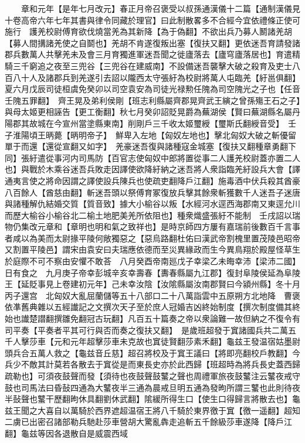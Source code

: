 　　章和元年【是年七月改元】春正月帝召褒受以叔孫通漢儀十二篇【通制漢儀見十卷高帝六年七年其書與律令同藏於理官】曰此制散畧多不合經今宜依禮條正使可施行　護羌校尉傅育欲伐燒當羌為其新降【為于偽翻】不欲出兵乃募人鬭諸羌胡【募人間搆諸羌使之自鬬也】羌胡不肯遂復叛出塞【復扶又翻】更依迷吾育請發諸郡兵數萬人共擊羌未及會三月育獨進軍迷吾聞之徙廬落去【廬穹廬落居也】育遣精騎三千窮追之夜至三兜谷【三兜谷在建威南】不設備迷吾襲擊大破之殺育及吏士八百八十人及諸郡兵到羌遂引去詔以隴西太守張紆為校尉將萬人屯臨羌【紆邕俱翻】　夏六月戊辰司徒桓虞免癸卯以司空袁安為司徒光禄勲任隗為司空隗光之子也【任音壬隗五罪翻】　齊王晃及弟利侯剛【班志利縣屬齊郡晃齊武王縯之曾孫殤王石之子】與母太姬更相誣告【更工衡翻】秋七月癸卯詔貶晃爵為蕪湖侯【賢曰蕪湖縣名屬丹陽郡其故城在今宣州當塗縣東南】削剛戶三千收太姬璽綬【璽斯氏翻綬音受】　壬子淮陽頃王昞薨【昞明帝子】　鮮卑入左地【匈奴左地也】擊北匈奴大破之斬優留單于而還【還從宣翻又如字】　羌豪迷吾復與諸種寇金城塞【復扶又翻種章勇翻下同】張紆遣從事河内司馬防【百官志使匈奴中郎將置從事二人護羌校尉蓋亦置二人也】與戰於木乘谷迷吾兵敗走因譯使欲降紆納之迷吾將人衆詣臨羌紆設兵大會【譯通夷言使之將命因謂之譯使設兵陳兵也使疏吏翻降戶江翻】施毒酒中伏兵殺其酋豪八百餘人【酋慈由翻】斬迷吾頭以祭傅育冢復放兵擊其餘衆斬獲數千人迷吾子迷唐與諸種解仇結婚交質【質音致】據大小榆谷以叛【水經河水逕西海郡南又東逕允川而歷大榆谷小榆谷北二榆土地肥美羌所依阻也】種衆熾盛張紆不能制　壬戌詔以瑞物仍集改元章和【章明也明和氣之致祥也】是時京師四方屢有嘉瑞前後數百千言事者咸以為美而太尉掾平陵何敞獨惡之【惡烏路翻杜佑曰漢武帝割槐里置茂陵邑昭帝又割置平陵邑】謂宋由袁安曰夫瑞應依德而至災異緣政而生今異鳥翔於殿屋怪草生於庭際不可不察由安懼不敢荅　八月癸酉帝南廵戊子幸梁乙未晦幸沛【梁沛二國】　日有食之　九月庚子帝幸彭城辛亥幸壽春【夀春縣屬九江郡】復封阜陵侯延為阜陵王【延貶事見上卷建初元年】己未幸汝陰【汝隂縣屬汝南郡賢曰今潁州縣】冬十月丙子還宫　北匈奴大亂屈蘭儲等五十八部口二十八萬詣雲中五原朔方北地降　曹褒依凖舊典雜以五經䜟記之文撰次天子至於庶人冠婚吉凶終始制度【撰次制度備其終始也䜟楚譛翻撰雛免翻冠古玩翻】凡百五十篇奏之帝以衆論難一故但納之不復令有司平奏【平奏者平其可行與否而奏之復扶又翻】　是歲班超發于窴諸國兵共二萬五千人擊莎車【元和元年超擊莎車未克故也窴徒賢翻莎素禾翻】龜兹王發温宿姑墨尉頭兵合五萬人救之【龜兹音丘慈】超召將校及于窴王議曰【將即亮翻校戶教翻】今兵少不敵其計莫若各散去于窴從是而東長史亦於此西歸【班超時為將兵長史蓋西歸疏勒也】可須夜鼓聲而發【須待也夜鼓聲鼓鼜之聲也周禮軍旅夜鼓鼜注云鼜夜戒守鼓也司馬法曰昏鼔四通為大鼜夜半三通為晨戒旦明五通為發昫所謂三鼜也此則待夜半鼔聲也鼜干歷翻昫休具翻劉休武翻】隂緩所得生口【使生口得歸言將散去也】龜兹王聞之大喜自以萬騎於西界遮超温宿王將八千騎於東界徼于窴【徼一遥翻】超知二虜已出密召諸部勒兵馳赴莎車營胡大驚亂犇走追斬五千餘級莎車遂降【降戶江翻】龜兹等因各退散自是威震西域

